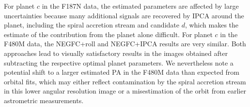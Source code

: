 \documentclass[longauth]{aa}
\newcommand{\vc}[1]{#1}
\begin{document}
\begin{appendix}
For planet $c$ in the F187N data, the estimated parameters are affected by large uncertainties %
because many additional signals are recovered by IPCA around the planet, including the spiral accretion stream and candidate $d$, which makes the estimate of the contribution from the planet alone difficult. %
For planet $c$ in the F480M data, the NEGFC+roll and NEGFC+IPCA results are very similar. Both approaches lead to visually satisfactory results in the images obtained after subtracting the respective optimal planet parameters. %
We nevertheless note a potential shift to a larger estimated PA in the F480M data than expected from orbital fits, which may either reflect contamination by the spiral accretion stream in this lower angular resolution image or a misestimation of the orbit from earlier astrometric measurements.



\end{appendix}
\end{document}
